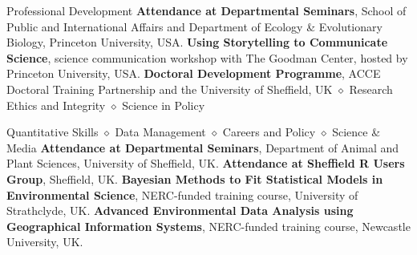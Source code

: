 \begin{rubric}{Professional Development}
 \textbf{Attendance at Departmental Seminars}, School of Public and International Affairs and Department of Ecology \& Evolutionary Biology, Princeton University, USA.
\entry*[2020] \textbf{Using Storytelling to Communicate Science}, science communication workshop with The Goodman Center, hosted by Princeton University, USA.
\entry*[2014 -- 2018] \textbf{Doctoral Development
Programme}, ACCE Doctoral Training Partnership and the University of Sheffield, UK $\diamond$ Research Ethics and Integrity $\diamond$ Science in Policy \par Quantitative Skills $\diamond$ Data Management $\diamond$ Careers and Policy $\diamond$ Science \& Media
\entry*[2014 -- 2018] \textbf{Attendance at Departmental Seminars}, Department of Animal and Plant Sciences, University of Sheffield, UK.
\entry*[2014 -- 2018] \textbf{Attendance at Sheffield R Users Group}, Sheffield, UK.
\entry*[2016] \textbf{Bayesian Methods to Fit Statistical Models in
Environmental Science}, NERC-funded training course, University of Strathclyde, UK.
\entry*[2015] \textbf{Advanced Environmental Data Analysis using
Geographical Information Systems}, NERC-funded training course, Newcastle University, UK.

\end{rubric}
